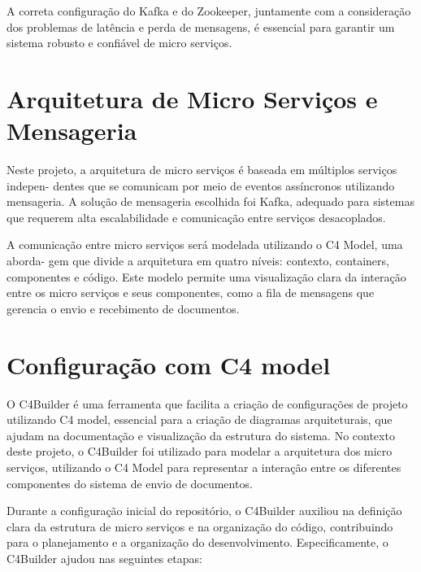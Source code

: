 A correta configuração do Kafka e do Zookeeper, juntamente com a consideração dos problemas de latência e perda de mensagens, é essencial para garantir um sistema robusto e confiável de micro serviços.

\section{Arquitetura de Micro Serviços e Mensageria}

Neste projeto, a arquitetura de micro serviços é baseada em múltiplos serviços indepen-
dentes que se comunicam por meio de eventos assíncronos utilizando mensageria. A solução
de mensageria escolhida foi Kafka, adequado para sistemas que requerem alta escalabilidade e
comunicação entre serviços desacoplados.

A comunicação entre micro serviços será modelada utilizando o C4 Model, uma aborda-
gem que divide a arquitetura em quatro níveis: contexto, containers, componentes e código. Este
modelo permite uma visualização clara da interação entre os micro serviços e seus componentes,
como a fila de mensagens que gerencia o envio e recebimento de documentos.

\section{Configuração com C4 model}

O C4Builder é uma ferramenta que facilita a criação de configurações de projeto utilizando C4 model, essencial para a criação de diagramas arquiteturais, que ajudam na documentação e visualização da estrutura do sistema. No contexto deste projeto, o C4Builder foi utilizado para modelar a arquitetura dos micro serviços, utilizando o C4 Model para representar a interação entre os diferentes componentes do sistema de envio de documentos.

Durante a configuração inicial do repositório, o C4Builder auxiliou na definição clara da estrutura de micro serviços e na organização do código, contribuindo para o planejamento e a organização do desenvolvimento. Especificamente, o C4Builder ajudou nas seguintes etapas:

